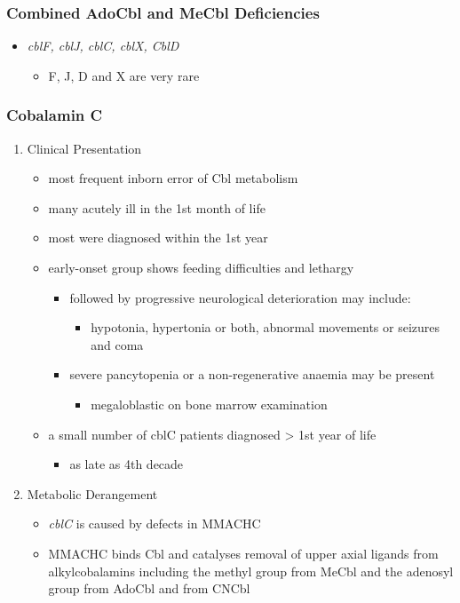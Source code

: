 \documentclass{scrartcl}
\begin{document}
\subsubsection{Combined AdoCbl and MeCbl Deficiencies}
\label{sec:org7db9ba3}
\begin{itemize}
\item \emph{cblF, cblJ, cblC, cblX, CblD}
\begin{itemize}
\item F, J, D and X are very rare
\end{itemize}
\end{itemize}
\subsubsection{Cobalamin C}
\label{sec:orga84a283}
\begin{enumerate}
\item Clinical Presentation
\label{sec:org6c8787d}
\begin{itemize}
\item most frequent inborn error of Cbl metabolism
\item many acutely ill in the 1st month of life
\item most were diagnosed within the 1st year
\item early-onset group shows feeding difficulties and lethargy
\begin{itemize}
\item followed by progressive neurological deterioration may include: 
\begin{itemize}
\item hypotonia, hypertonia or both, abnormal movements or seizures
and coma
\end{itemize}
\item severe pancytopenia or a non-regenerative anaemia may be present
\begin{itemize}
\item megaloblastic on bone marrow examination
\end{itemize}
\end{itemize}
\item a small number of cblC patients diagnosed \textgreater{} 1st year of life
\begin{itemize}
\item as late as 4th decade
\end{itemize}
\end{itemize}

\item Metabolic Derangement
\label{sec:org760d378}
\begin{itemize}
\item \emph{cblC} is caused by defects in MMACHC
\item MMACHC binds Cbl and catalyses removal of upper axial ligands from
alkylcobalamins including the methyl group from MeCbl and the
adenosyl group from AdoCbl and from CNCbl
\end{itemize}


\end{enumerate}
\end{document}
